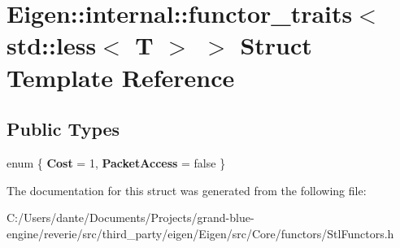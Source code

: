 \hypertarget{struct_eigen_1_1internal_1_1functor__traits_3_01std_1_1less_3_01_t_01_4_01_4}{}\section{Eigen\+::internal\+::functor\+\_\+traits$<$ std\+::less$<$ T $>$ $>$ Struct Template Reference}
\label{struct_eigen_1_1internal_1_1functor__traits_3_01std_1_1less_3_01_t_01_4_01_4}
\subsection*{Public Types}
\begin{DoxyCompactItemize}
\item 
\mbox{\label{struct_eigen_1_1internal_1_1functor__traits_3_01std_1_1less_3_01_t_01_4_01_4_a3afb73b4a003e16f15a4cd9eb8f8c407}} 
enum \{ {\bfseries Cost} = 1, 
{\bfseries Packet\+Access} = false
 \}
\end{DoxyCompactItemize}


The documentation for this struct was generated from the following file\+:\begin{DoxyCompactItemize}
\item 
C\+:/\+Users/dante/\+Documents/\+Projects/grand-\/blue-\/engine/reverie/src/third\+\_\+party/eigen/\+Eigen/src/\+Core/functors/Stl\+Functors.\+h\end{DoxyCompactItemize}
